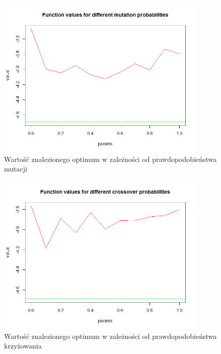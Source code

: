 \documentclass[11pt, a4paper]{article}
\begin{document}
\begin{figure}[H]
	\begin{center}
		\includegraphics[width=0.9\textwidth]{./assets/EMichalewicz2.png} %
		\caption{Wartość znalezionego optimum w zależności od prawdopodobieństwa mutacji}
		\label{fig:gulf7}
	\end{center}
\end{figure}
\begin{figure}[H]
	\begin{center}
		\includegraphics[width=0.9\textwidth]{./assets/EMichalewicz3.png} %
		\caption{Wartość znalezionego optimum w zależności od prawdopodobieństwa krzyżowania}
		\label{fig:gulf7}
	\end{center}
\end{figure}
\end{document}
